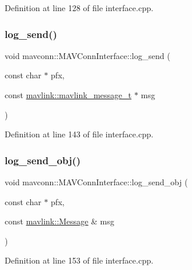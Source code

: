 Definition at line 128 of file interface.\+cpp.

\mbox{\label{group__mavconn_ga7a6bcc0b1c21c9016422e2c20b4b04d0}} 
\subsubsection{\texorpdfstring{log\_send()}{log\_send()}}
{\footnotesize\ttfamily void mavconn\+::\+M\+A\+V\+Conn\+Interface\+::log\+\_\+send (\begin{DoxyParamCaption}\item[{const char $\ast$}]{pfx,  }\item[{const \mbox{\hyperlink{include__v0_89_2mavlink__types_8h_a63b963764c09dc72f4910c1521e325b9}{mavlink\+::mavlink\+\_\+message\+\_\+t}} $\ast$}]{msg }\end{DoxyParamCaption})\hspace{0.3cm}{\ttfamily [protected]}}



Definition at line 143 of file interface.\+cpp.

\mbox{\label{group__mavconn_ga52bf39da3102cf3376a801f5b0f647a5}} 
\subsubsection{\texorpdfstring{log\_send\_obj()}{log\_send\_obj()}}
{\footnotesize\ttfamily void mavconn\+::\+M\+A\+V\+Conn\+Interface\+::log\+\_\+send\+\_\+obj (\begin{DoxyParamCaption}\item[{const char $\ast$}]{pfx,  }\item[{const \mbox{\hyperlink{structmavlink_1_1Message}{mavlink\+::\+Message}} \&}]{msg }\end{DoxyParamCaption})\hspace{0.3cm}{\ttfamily [protected]}}



Definition at line 153 of file interface.\+cpp.

\mbox{\label{group__mavconn_ga76a9378a9bfc4f2b6f1b9c3ecb00ec9a}} 
